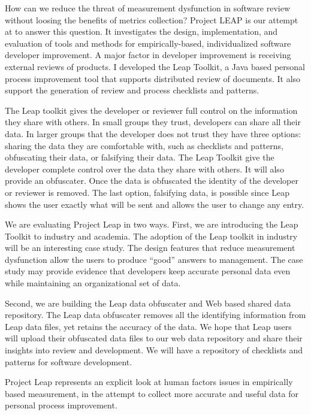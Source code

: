 \documentclass[12pt]{article}
\begin{document}
How can we reduce the threat of measurement dysfunction in software review
without loosing the benefits of metrics collection?  Project
LEAP\cite{Leap} is our attempt
at to answer this question.  It investigates the design, implementation,
and evaluation of tools and methods for empirically-based, individualized
software developer improvement.  A major factor in developer improvement is
receiving external reviews of products. I developed the Leap Toolkit, a
Java based personal process improvement tool that supports distributed
review of documents.  It also support the generation of review and process
checklists and patterns.

The Leap toolkit gives the developer or reviewer full control on the
information they share with others.  In small groups they trust, developers
can share all their data.  In larger groups that the developer does not
trust they have three options: sharing the data they are comfortable with,
such as checklists and patterns, obfuscating their data, or falsifying
their data.  The Leap Toolkit give the developer complete control over the
data they share with others.  It will also provide an obfuscater.  Once the
data is obfuscated the identity of the developer or reviewer is removed.
The last option, falsifying data, is possible since Leap shows the user
exactly what will be sent and allows the user to change any entry.

We are evaluating Project Leap in two ways.  First, we are introducing the
Leap Toolkit to industry and academia.  The adoption of the Leap toolkit in
industry will be an interesting case study.  The design features that
reduce measurement dysfunction allow the users to produce ``good'' answers
to management.  The case study may provide evidence that developers keep
accurate personal data even while maintaining an organizational set of
data.

Second, we are building the Leap data obfuscater and Web based shared data
repository.  The Leap data obfuscater removes all the identifying
information from Leap data files, yet retains the accuracy of the data.  We 
hope that Leap users will upload their obfuscated data files to our web
data repository and share their insights into review and development.  We
will have a repository of checklists and patterns for software development.

Project Leap represents an explicit look at human factors issues in
empirically based measurement, in the attempt to collect more accurate and
useful data for personal process improvement.



\end{document}
